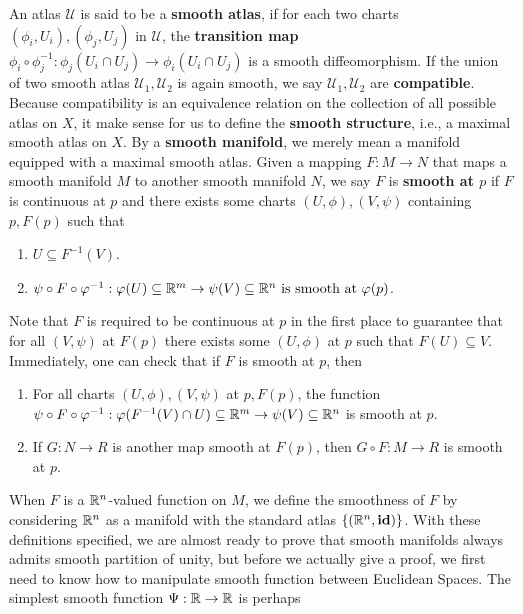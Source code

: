 \documentclass{report}
\begin{document}
\begin{mdframed}
An atlas $\mathcal{U}$ is said to be a \textbf{smooth atlas}, if for each two charts $(\phi_i,U_i),(\phi_j,U_j)$ in $\mathcal{U}$, the \textbf{transition map} $\phi_i\circ \phi_j^{-1}: \phi_j (U_i \cap U_j)\rightarrow \phi_i (U_i \cap U_j)$ is a smooth diffeomorphism. If the union of two smooth atlas $\mathcal{U}_1,\mathcal{U}_2$ is again smooth, we say $\mathcal{U}_1,\mathcal{U}_2$ are \textbf{compatible}. Because compatibility is an equivalence relation on the collection of all possible atlas on $X$, it make sense for us to define the \textbf{smooth structure}, i.e., a maximal smooth atlas on $X$. By a \textbf{smooth manifold}, we merely mean a manifold equipped with a maximal smooth atlas. Given a mapping $F:M\rightarrow N$ that maps a smooth manifold $M$ to another smooth manifold  $N$, we say  $F$ is \textbf{smooth at $p$} if $F$ is continuous at $p$ and there exists some charts $(U,\phi),(V,\psi)$ containing $p,F(p)$ such that 
\begin{enumerate}[label=(\roman*)]
  \item $U \subseteq F^{-1}(V)$. 
  \item $\psi \circ F\circ \varphi^{-1} : \varphi (U) \subseteq \mathbb{R}^m \rightarrow \psi (V)\subseteq \mathbb{R}^n\text{  is smooth at }\varphi (p)$. 
\end{enumerate}
Note that $F$ is required to be continuous at $p$ in the first place to guarantee that for all $(V,\psi)$ at $F(p)$ there exists some $(U,\phi)$ at $p$ such that $F(U)\subseteq V$. Immediately, one can check that if $F$ is smooth at  $p$, then 
\begin{enumerate}[label=(\alph*)]
  \item For all charts $(U,\phi),(V,\psi)$ at $p,F(p)$, the function $\psi \circ F\circ \varphi ^{-1}:\varphi(F^{-1}(V)\cap U )\subseteq \mathbb{R}^m\rightarrow \psi  (V )\subseteq \mathbb{R}^n$ is smooth at $p$. 
  \item If $G:N\rightarrow R$ is another map smooth at $F(p)$, then $G\circ F:M\rightarrow R$ is smooth at $p$.  
\end{enumerate}
When $F$ is a $\mathbb{R}^n$-valued function on $M$, we define the smoothness of  $F$ by considering  $\mathbb{R}^n$ as a manifold with the standard atlas  $\{ (\mathbb{R}^n,\textbf{id}) \}$. With these definitions specified, we are almost ready to prove that smooth manifolds always admits smooth partition of unity, but before we actually give a proof, we first need to know how to manipulate smooth function between Euclidean Spaces. The simplest smooth function $\Psi:\mathbb{R}\rightarrow \mathbb{R}$ is perhaps 

\end{mdframed}
\end{document}
